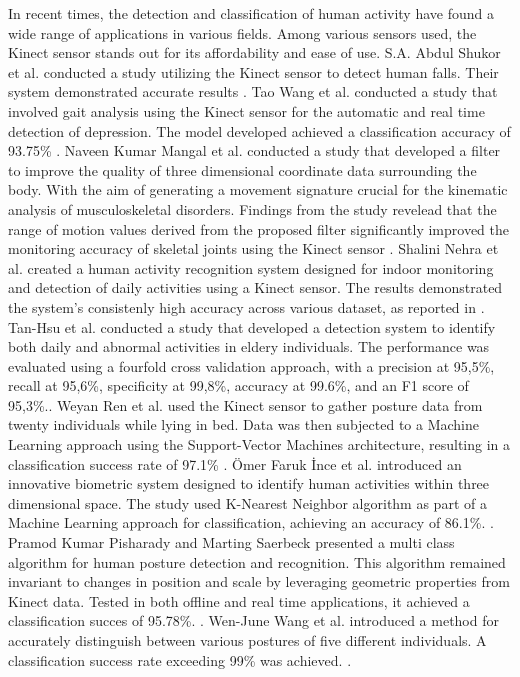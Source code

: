       In recent times, the detection and classification of human activity have found a wide range of applications in various fields. Among various sensors used, the Kinect sensor stands out for its affordability and ease of use. S.A. Abdul Shukor et al. conducted a study utilizing the Kinect sensor to detect human falls. Their system demonstrated accurate results \cite{saidin_analysis_2020}. 
      Tao Wang et al. conducted a study that involved gait analysis using the Kinect sensor for the automatic and real time detection of depression. The model developed achieved a classification accuracy of 93.75\% \cite{wang_gait_2021}.
      Naveen Kumar Mangal et al. conducted a study that developed a filter to improve the quality of three dimensional coordinate data surrounding the body. With the aim of generating a movement signature crucial for the kinematic analysis of musculoskeletal disorders. Findings from the study revelead that the range of motion values derived from the proposed filter significantly improved the monitoring accuracy of skeletal joints using the Kinect sensor \cite{mangal_kinect_2020}. 
      Shalini Nehra et al. created a human activity recognition system designed for indoor monitoring and detection of daily activities using a Kinect sensor. The results demonstrated the system's consistenly high accuracy across various dataset, as reported in \cite{nehra_unobtrusive_2020}.
      Tan-Hsu et al. conducted a study that developed a detection system to identify both daily and abnormal activities in eldery individuals. The performance was evaluated using a fourfold cross validation approach, with a precision at 95,5\%, recall at 95,6\%, specificity at 99,8\%, accuracy at 99.6\%, and an F1 score of 95,3\%.\cite{tan_activity_2020}. 
      Weyan Ren et al. used the Kinect sensor to gather posture data from twenty individuals while lying in bed. Data was then subjected to a Machine Learning approach using the Support-Vector Machines architecture, resulting in a classification success rate of 97.1\% \cite{ren_human_2020}.
      \"{O}mer Faruk \.{I}nce et al. introduced an innovative biometric system designed to identify human activities within three dimensional space. The study used K-Nearest Neighbor algorithm as part of a Machine Learning approach for classification, achieving an accuracy of 86.1\%.  \cite{ince_human_2020}.
      Pramod Kumar Pisharady and Marting Saerbeck presented a multi class algorithm for human posture detection and recognition. This algorithm remained invariant to changes in position and scale by leveraging geometric properties from Kinect data. Tested in both offline and real time applications, it achieved a classification succes of 95.78\%. \cite{pisharady_kinect_2013}.
      Wen-June Wang et al. introduced a method for accurately distinguish between various postures of five different individuals. A classification success rate exceeding 99\% was achieved. \cite{wang_gait_2021}.

